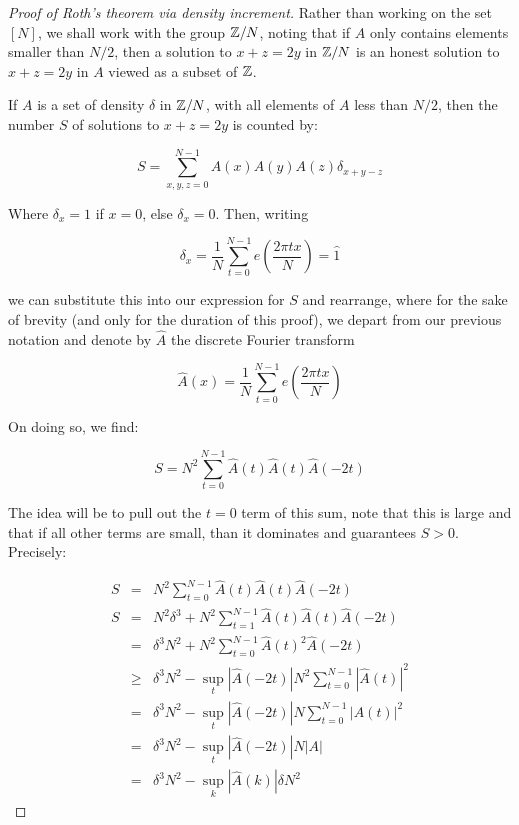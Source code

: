 \documentclass{report}
\theoremstyle{remark}
\numberwithin{equation}{section}
\begin{document}
\begin{proof}[Proof of Roth's theorem via density increment]

  Rather than working on the set $[N]$, we shall work with the group
  $\mathbb{Z}/N$, noting that if $A$ only contains elements smaller than
  $N/2$, then a solution to $x+z=2y$ in $\mathbb{Z}/N$ is an honest solution
  to $x+z=2y$ in $A$ viewed as a subset of $\mathbb{Z}$.  

  If $A$ is a set of density $\delta$ in $\mathbb{Z}/N$, with all elements of
  $A$ less than $N/2$, then the number $S$ of solutions to $x+z=2y$ is
  counted by:

  \[S = \sum_{x, y, z = 0}^{N-1}A(x)A(y)A(z)\delta_{x+y-z}\]

  Where $\delta_x = 1$ if $x = 0$, else $\delta_x = 0$.  Then, writing

  \[\delta_x = \frac{1}{N}\sum_{t=0}^{N-1}e(\frac{2\pi tx}{N}) =
    \widehat{1}\]

  we can substitute this into our expression for $S$ and rearrange,
  where for the sake of brevity (and only for the duration of this
  proof), we depart from our previous notation and denote by
  $\widehat{A}$ the discrete Fourier transform 

  \[\widehat{A}(x) = \frac{1}{N}\sum_{t=0}^{N-1}e(\frac{2\pi tx}{N})\]

  On doing so, we find:

  \[S = N^2 \sum_{t=0}^{N-1} \widehat{A}(t)\widehat{A}(t)\widehat{A}(-2t)\]

  The idea will be to pull out the $t = 0$ term of this sum, note that
  this is large and that if all other terms are small, than it
  dominates and guarantees $S > 0$.  Precisely:

  \begin{eqnarray*}
    S &=& N^2 \sum_{t=0}^{N-1} \widehat{A}(t)\widehat{A}(t)\widehat{A}(-2t) \\
    S &=& N^2 \delta^3 + N^2 \sum_{t=1}^{N-1} \widehat{A}(t)\widehat{A}(t)\widehat{A}(-2t) \\
      &=& \delta^3 N^2 + N^2 \sum_{t=0}^{N-1} \widehat{A}(t)^2\widehat{A}(-2t) \\
      &\geq& \delta^3 N^2 - \sup_t |\widehat{A}(-2t)| N^2 \sum_{t=0}^{N-1} |\widehat{A}(t)|^2 \\
      &=& \delta^3 N^2 - \sup_t |\widehat{A}(-2t)| N \sum_{t=0}^{N-1} |A(t)|^2 \\
      &=& \delta^3 N^2 - \sup_t |\widehat{A}(-2t)| N |A|\\
      &=& \delta^3 N^2 - \sup_k |\widehat{A}(k)| \delta N^2
  \end{eqnarray*}


\end{proof}
\end{document}
